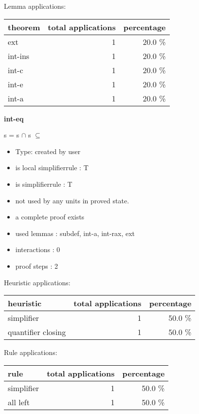 \documentclass[a4paper]{article}
\begin{document}
Lemma applications:

\begin{supertabular}{l|r|r}
theorem	        & total applications & percentage \\ \hline
ext & 1 & 20.0 \% \\
int-ins & 1 & 20.0 \% \\
int-c & 1 & 20.0 \% \\
int-e & 1 & 20.0 \% \\
int-a & 1 & 20.0 \% \\

\end{supertabular}
\pagebreak

{\LARGE\bf int-eq}\label{lemma-int-eq}

\medskip

 \Fol s = s $\cap$  \Equiv s $\subseteq$ 

\begin{itemize}

\item Type: created by user

\item is local simplifierrule : T
\item is simplifierrule : T
\item not used by any units in proved state.
\item       a complete proof exists
\item       used lemmas  : subdef, int-a, int-rax, ext
\item       interactions : 0
\item       proof steps  : 2
\end{itemize}

\medskip


Heuristic applications:

\begin{supertabular}{l|r|r}
heuristic	& total applications & percentage \\ \hline
simplifier & 1 & 50.0 \% \\
quantifier closing & 1 & 50.0 \% \\

\end{supertabular}

Rule applications:

\begin{supertabular}{l|r|r}
rule	        & total applications & percentage \\ \hline
simplifier & 1 & 50.0 \% \\
all left & 1 & 50.0 \% \\

\end{supertabular}
\end{document}
